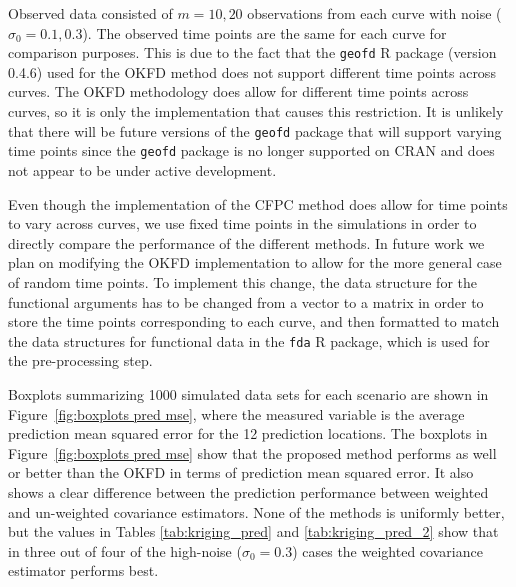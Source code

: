 Observed data consisted of $m = 10, 20$ observations from each curve with noise ($\sigma_0=0.1, 0.3$). The observed time points are the same for each curve for comparison purposes. This is due to the fact that the \texttt{geofd} R package (version 0.4.6) used for the OKFD method does not support different time points across curves. The OKFD methodology does allow for different time points across curves, so it is only the implementation that causes this restriction. It is unlikely that there will be future versions of the \texttt{geofd} package that will support varying time points since the \texttt{geofd} package is no longer supported on CRAN and does not appear to be under active development. 

Even though the implementation of the CFPC method does allow for time points to vary across curves, we use fixed time points in the simulations in order to directly compare the performance of the different methods. In future work we plan on modifying the OKFD implementation to allow for the more general case of random time points. To implement this change, the data structure for the functional arguments has to be changed from a vector to a matrix in order to store the time points corresponding to each curve, and then formatted to match the data structures for functional data in the \texttt{fda} R package, which is used for the pre-processing step.                                            

Boxplots summarizing 1000 simulated data sets for each scenario are shown in Figure~\ref{fig:boxplots pred mse}, where the measured variable is the average prediction mean squared error for the 12 prediction locations. The boxplots in Figure~\ref{fig:boxplots pred mse} show that the proposed method performs as well or better than the OKFD in terms of prediction mean squared error. It also shows a clear difference between the prediction performance between weighted and un-weighted covariance estimators. None of the methods is uniformly better, but the values in Tables \ref{tab:kriging_pred} and \ref{tab:kriging_pred_2} show that in three out of four of the high-noise ($\sigma_0 = 0.3$) cases the weighted covariance estimator performs best.  
 
